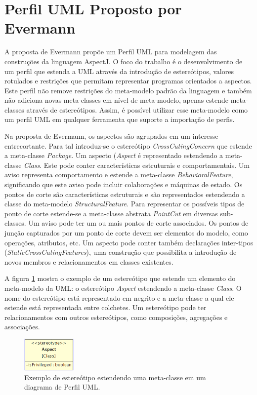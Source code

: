 \section{Perfil UML Proposto por Evermann}

A proposta de Evermann \cite{Evermann:2007:MSP:1229375.1229379} propõe um Perfil UML para modelagem das construções da linguagem AspectJ. O foco do
trabalho é o desenvolvimento de um perfil que estenda a UML através da introdução de estereótipos, valores rotulados e restrições que permitam representar 
programas orientados a aspectos. Este perfil não remove restrições do meta-modelo padrão da linguagem e também não adiciona novas meta-classes em nível de
meta-modelo, apenas estende meta-classes através de estereótipos. Assim, é possível utilizar esse meta-modelo como um perfil UML em qualquer ferramenta que 
suporte a importação de perfis.

Na proposta de Evermann, os aspectos são agrupados em um interesse entrecortante. Para tal introduz-se o estereótipo \textit{CrossCutingConcern} que
estende a meta-classe \textit{Package}. Um aspecto (\textit{Aspect} é representado estendendo a meta-classe \textit{Class}. Este pode conter características
estruturais e comportamentais. Um aviso representa comportamento e estende a meta-classe \textit{BehavioralFeature}, significando que este aviso pode
incluir colaborações e máquinas de estado. Os pontos de corte são características estruturais e são representados estendendo a classe do meta-modelo
\textit{StructuralFeature}. Para representar os possíveis tipos de ponto de corte estende-se a meta-classe abstrata \textit{PointCut} em diversas
sub-classes. Um aviso pode ter um ou mais pontos de corte associados. Os pontos de junção capturados por um ponto de corte devem ser elementos do
modelo, como operações, atributos, etc. Um aspecto pode conter também declarações inter-tipos (\textit{StaticCrossCutingFeatures}), uma construção que
possibilita a introdução de novos membros e relacionamentos em classes existentes. 

A figura \ref{fig:p21_meta_class} mostra o exemplo de um estereótipo que estende um elemento do meta-modelo da UML: o estereótipo \textit{Aspect}
estendendo a meta-classe \textit{Class}. O nome do estereótipo está representado em negrito e a meta-classe a qual ele estende está representada entre
colchetes. Um estereótipo pode ter relacionamentos com outros estereótipos, como composições, agregações e associações.

\begin{figure}[h]
	\centering
	\includegraphics[width=100px]{img/p21_meta_class.png}
	\caption{Exemplo de estereótipo estendendo uma meta-classe em um diagrama de Perfil UML.}\label{fig:p21_meta_class}
\end{figure}

